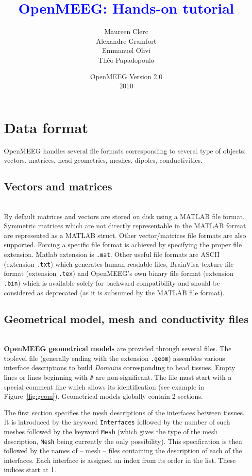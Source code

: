 \documentclass[10pt,journal]{book}
\title{\textbf{\textcolor{blue}{OpenMEEG: Hands-on tutorial}}}
\author{Maureen Clerc\\Alexandre Gramfort \\
        Emmanuel Olivi \\Théo Papadopoulo}
\date{OpenMEEG Version 2.0 \\2010}
\begin{document}
    \maketitle
    \tableofcontents



\chapter{Data format}

OpenMEEG handles several file formats corresponding to several type of objects: vectors, matrices, head geometries, meshes, dipoles, conductivities.

    \section{Vectors and matrices}\mbox{ }\\
    By default matrices and vectors are stored on disk using a MATLAB file format. Symmetric matrices which are not directly representable in the MATLAB
    format are represented as a MATLAB struct. Other vector/matrices file formats are also supported. Forcing a specific file format is achieved by
    specifying the proper file extension. Matlab extension is {\tt .mat}. Other useful file formats are ASCII (extension {\tt .txt}) which generates
    human readable files, BrainVisa texture file format (extension {\tt .tex}) and OpenMEEG's own binary file format (extension {\tt .bin}) which is available
    solely for backward compatibility and should be considered as deprecated (as it is subsumed by the MATLAB file format).

    \section{Geometrical model,  mesh and conductivity files}\mbox{ }\\
    {\bf OpenMEEG geometrical models} are provided through several files. The toplevel file (generally ending with the extension {\tt .geom}) assembles various
    interface descriptions to build \emph{Domains} corresponding to head tissues. Empty lines or lines beginning with {\tt \#} are non-significant.
    The file must start with a special comment line which allows its identification (see example in Figure~\ref{fig:geom}). Geometrical models globally contain 2 sections.

    \medskip

    The first section specifies the mesh descriptions of the interfaces between tissues. It is introduced by the keyword {\tt Interfaces} followed
    by the number of such meshes followed by the keyword {\tt Mesh} (which gives the type of the mesh description, {\tt Mesh} being currently the only
    possibility). This specification is then followed by the names of -- mesh -- files containing the description of each of the interfaces. Each interface
    is assigned an index from its order in the list. These indices start at 1.
\end{document}
